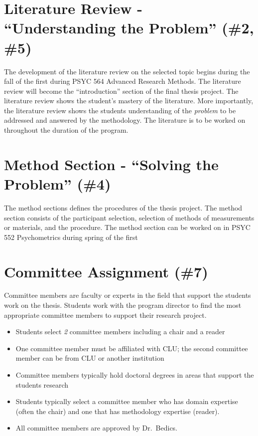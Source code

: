 \documentclass[]{book}
\providecommand{\tightlist}{%
  \setlength{\itemsep}{0pt}\setlength{\parskip}{0pt}}
\begin{document}
\hypertarget{literature-review---understanding-the-problem-2-5}{%
\section{Literature Review - ``Understanding the Problem'' (\#2, \#5)}\label{literature-review---understanding-the-problem-2-5}}

The development of the literature review on the selected topic begins during the fall of the first during PSYC 564 Advanced Research Methods. The literature review will become the ``introduction'' section of the final thesis project. The literature review shows the student's mastery of the literature. More importantly, the literature review shows the students understanding of the \emph{problem} to be addressed and answered by the methodology. The literature is to be worked on throughout the duration of the program.

\hypertarget{method-section---solving-the-problem-4}{%
\section{Method Section - ``Solving the Problem'' (\#4)}\label{method-section---solving-the-problem-4}}

The method sections defines the procedures of the thesis project. The method section consists of the participant selection, selection of methods of measurements or materials, and the procedure. The method section can be worked on in PSYC 552 Psychometrics during spring of the first

\hypertarget{committee-assignment-7}{%
\section{Committee Assignment (\#7)}\label{committee-assignment-7}}

Committee members are faculty or experts in the field that support the students work on the thesis. Students work with the program director to find the most appropriate committee members to support their research project.

\begin{itemize}
\tightlist
\item
  Students select \emph{2} committee members including a chair and a reader
\item
  One committee member must be affiliated with CLU; the second committee member can be from CLU or another institution
\item
  Committee members typically hold doctoral degrees in areas that support the students research
\item
  Students typically select a committee member who has domain expertise (often the chair) and one that has methodology expertise (reader).\\
\item
  All committee members are approved by Dr.~Bedics.
\end{itemize}
\end{document}
